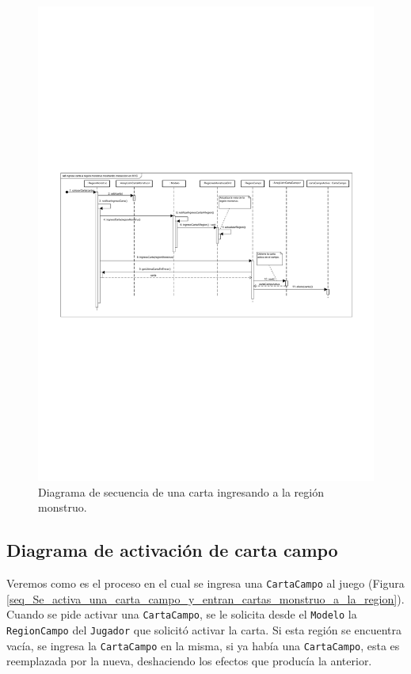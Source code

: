 	\begin{figure}[H]
		\centering
		\includegraphics[scale=0.8]{includes/seq_Ingresa_carta_a_region_monstruo_mostrando_interaccion_en_MVC}
		\caption{Diagrama de secuencia de una carta ingresando a la región monstruo.}
		\label{seq_Ingresa_carta_a_region_monstruo_mostrando_interaccion_en_MVC}
	\end{figure}
	
	\subsection{Diagrama de activación de carta campo}
	
	Veremos como es el proceso en el cual se ingresa una \texttt{CartaCampo} al juego (Figura \ref{seq_Se_activa_una_carta_campo_y_entran_cartas_monstruo_a_la_region}).
	Cuando se pide activar una \texttt{CartaCampo}, se le solicita desde el \texttt{Modelo} la \texttt{RegionCampo} del \texttt{Jugador} que solicitó activar la carta. Si esta región se encuentra vacía, se ingresa la \texttt{CartaCampo} en la misma, si ya había una \texttt{CartaCampo}, esta es reemplazada por la nueva, deshaciendo los efectos que producía la anterior.
	
